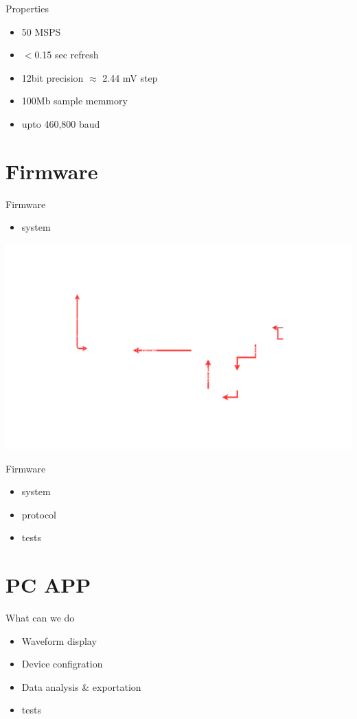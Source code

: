 \documentclass{beamer}
\begin{document}
	\begin{frame}{Properties}
		\begin{itemize}
			\item 50 MSPS
			\item $<$0.15 sec refresh
			\item 12bit precision $\approx$ 2.44 mV step
			\item 100Mb sample memmory
			\item upto 460,800 baud
		\end{itemize}
	\end{frame}


\section{Firmware}
	\begin{frame}{Firmware}
		\begin{itemize}
			\item system
		\end{itemize}
	\end{frame}

	\begin{frame}
		\includegraphics[width=1\paperwidth]{Firmware.png}
	\end{frame}

	\begin{frame}{Firmware}
		\begin{itemize}
			\item system
			\item protocol
			\item tests
		\end{itemize}
	\end{frame}

\section{PC APP}
	\begin{frame}{What can we do}
		\begin{itemize}
			\item Waveform display
			\item Device configration
			\item Data analysis \& exportation
			\item tests
		\end{itemize}
	\end{frame}
\end{document}
